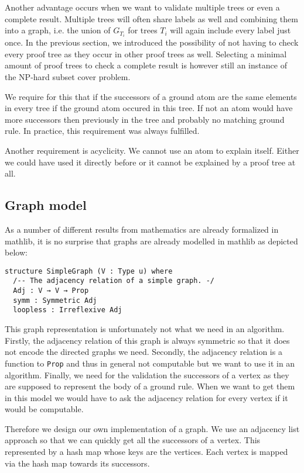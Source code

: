 Another advantage occurs when we want to validate multiple trees or even a complete result. Multiple trees will often share labels as well and combining them into a graph, i.e. the union of $G_{T_i}$ for trees $T_i$ will again include every label just once. In the previous section, we introduced the possibility of not having to check every proof tree as they occur in other proof trees as well. Selecting a minimal amount of proof trees to check a complete result is however still an instance of the NP-hard subset cover problem.

We require for this that if the successors of a ground atom are the same elements  in every tree if the ground atom occured in this tree. If not an atom would have more successors then previously in the tree and probably no matching ground rule. In practice, this requirement was always fulfilled.

Another requirement is acyclicity. We cannot use an atom to explain itself. Either we could have used it directly before or it cannot be explained by a proof tree at all. 
\subsection{Graph model}

As a number of different results from mathematics are already formalized in mathlib, it is no surprise that graphs are already modelled in mathlib as depicted below:

\begin{lstlisting}
structure SimpleGraph (V : Type u) where
  /-- The adjacency relation of a simple graph. -/
  Adj : V → V → Prop
  symm : Symmetric Adj 
  loopless : Irreflexive Adj
\end{lstlisting}

This graph representation is unfortunately not what we need in an algorithm. Firstly, the adjacency relation of this graph is always symmetric so that it does not encode the directed graphs we need. Secondly, the adjacency relation is a function to \lstinline|Prop| and thus in general not computable but we want to use it in an algorithm. Finally, we need for the validation the successors of a vertex as they are supposed to represent the body of a ground rule. When we want to get them in this model we would have to ask the adjacency relation for every vertex if it would be computable.

Therefore we design our own implementation of a graph. We use an adjacency list approach so that we can quickly get all the successors of a vertex. This represented by a hash map whose keys are the vertices. Each vertex is mapped via the hash map towards its successors.

